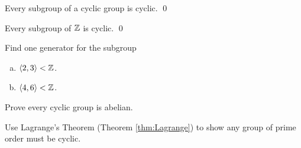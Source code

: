 \documentclass[../algebraNotesMSRI-UP2016.tex]{subfiles}
\begin{document}
\begin{frame}[c]
\begin{prop}\label{prop:subgroupOfACyclic}
Every subgroup of a cyclic group is cyclic.
\qed
\end{prop}
%

\smallGap
\begin{cor}
Every subgroup of $\mathbb Z$ is cyclic.
\qed
\end{cor}
\end{frame}

\begin{frame}
\begin{exe}[cf. Problem 58]\label{exe:prob58}
Find one generator for the subgroup
\begin{enumerate}[(a)]
\item $\langle 2,3\rangle< \mathbb Z$.
\item $\langle 4,6\rangle< \mathbb Z$.
\end{enumerate} 
\end{exe}

\smallGap
\begin{exe}[cf. Problem 59]\label{exe:prob59}
Prove every cyclic group is abelian.
\end{exe}
%
%

\smallGap
\begin{exe}[cf. Problem 60]\label{exe:prob60}
Use Lagrange's Theorem (Theorem \ref{thm:Lagrange}) to show any group of prime order must be cyclic.
\end{exe}
\end{frame}

\begin{comment}
\answerKey
\begin{frame}{\subsecname}
\exeSol{exe:subgroupOfACyclic}
\end{frame}

\begin{frame}
\exeSol[(cf. Problem 58)]{exe:prob58}
\end{frame}

\begin{frame}
\exeSol[(cf. Problem 59)]{exe:prob59}
\end{frame}

\begin{frame}
\exeSol[(cf. Problem 60)]{exe:prob60}
\end{frame}

\end{comment}
\end{document}
